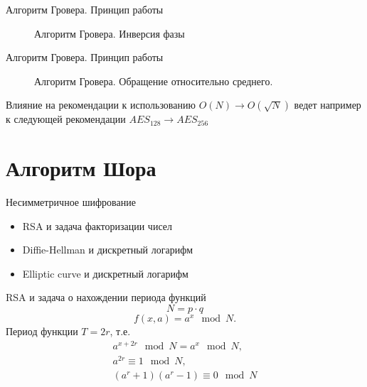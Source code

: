 \documentclass[10pt,pdf,hyperref={unicode}]{beamer}
\begin{document}
\begin{frame}{Алгоритм Гровера. Принцип работы}
\begin{figure}
\centering

\scalebox{.5}{}

\caption{Алгоритм Гровера. Инверсия фазы}
\label{figQuantCompGroverInv}
\end{figure}
\end{frame}

\begin{frame}{Алгоритм Гровера. Принцип работы}
\begin{figure}
\centering

\scalebox{.5}{}

\caption{Алгоритм Гровера. Обращение относительно
  среднего.}
\label{figQuantCompGroverInvMiddle}
\end{figure}

\end{frame}


\begin{frame}{Влияние на рекомендации к использованию}
$O(N) \rightarrow O(\sqrt{N})$
ведет например к следующей рекомендации
$AES_{128} \rightarrow AES_{256}$
\end{frame}


\section{Алгоритм Шора}
\begin{frame}{Несимметричное шифрование}
\begin{itemize}
\item RSA и задача факторизации чисел
\item Diffie-Hellman и дискретный логарифм
\item Elliptic curve и дискретный логарифм
\end{itemize}
\end{frame}

\begin{frame}{RSA и задача о нахождении периода функций}
\[
N = p \cdot q
\]
\[
f\left(x, a\right) = a^x \mod N.
\]
Период функции $T = 2r$, т.е.
\begin{eqnarray}
a^{x+2r} \mod N = a^x \mod N,
\nonumber \\
a^{2r} \equiv 1 \mod N,
\nonumber \\
(a^r + 1)(a^r - 1)  \equiv 0 \mod N
\nonumber
\end{eqnarray}
\end{frame}
\end{document}
